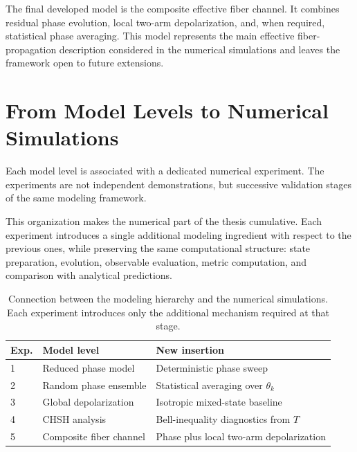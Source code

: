 \medskip

The final developed model is the composite effective fiber channel. It combines residual phase evolution, local two-arm depolarization, and, when required, statistical phase averaging. This model represents the main effective fiber-propagation description considered in the numerical simulations and leaves the framework open to future extensions.


\section{From Model Levels to Numerical Simulations}

Each model level is associated with a dedicated numerical experiment. The experiments are not independent demonstrations, but successive validation stages of the same modeling framework.

\medskip

This organization makes the numerical part of the thesis cumulative. Each experiment introduces a single additional modeling ingredient with respect to the previous ones, while preserving the same computational structure: state preparation, evolution, observable evaluation, metric computation, and comparison with analytical predictions.

\medskip

\begin{table}[htbp]
\centering
\small
\setlength{\tabcolsep}{4pt}
\begin{tabular}{lll}
\hline
\textbf{Exp.} & \textbf{Model level} & \textbf{New insertion} \\
\hline
1 & Reduced phase model & Deterministic phase sweep \\
2 & Random phase ensemble & Statistical averaging over \( \theta_k \) \\
3 & Global depolarization & Isotropic mixed-state baseline \\
4 & CHSH analysis & Bell-inequality diagnostics from \( T \) \\
5 & Composite fiber channel & Phase plus local two-arm depolarization \\
\hline
\end{tabular}
\caption{Connection between the modeling hierarchy and the numerical simulations. Each experiment introduces only the additional mechanism required at that stage.}
\label{tab:modeling_hierarchy_experiments}
\end{table}

